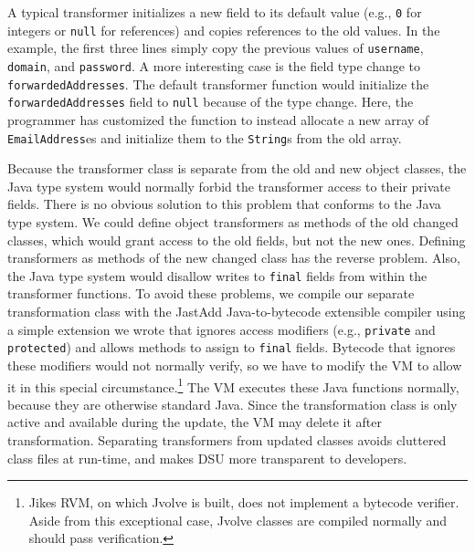\documentclass[9pt]{sigplanconf}
\newcommand{\DSU}{{\sc Jvolve}}
\newcommand{\JikesRVM}{Jikes RVM}
\begin{document}
A typical transformer initializes a new field to its default
value (e.g., {\tt 0} for integers or {\tt null} for references)
and copies references to the old values.  In the example, the first
three lines simply copy the previous values of {\tt username}, {\tt
domain}, and {\tt password}.
A more interesting case is the
field type change to {\tt forwardedAddresses}. %
The default transformer function would %
initialize the {\tt forwardedAddresses} field
to {\tt null} because of the type change.
Here, the programmer has customized the function to instead allocate a new array of {\tt EmailAddress}es
and initialize them to the {\tt String}s from the old array.  

Because the
transformer class is separate from the old and new object classes, the
Java type system would normally forbid the transformer access to their private
fields.  There is no obvious solution to this problem that conforms to
the Java type system. We could define object transformers as
methods of the old changed classes, which would grant access
to the old fields, but not the new ones.  Defining transformers as methods of the
new changed class has the reverse problem. Also, the Java type system
would disallow writes to {\tt final} fields from within the transformer
functions.
To avoid these problems, we
compile our separate transformation class with the JastAdd 
Java-to-bytecode extensible compiler \cite{JastAddJ} using a simple
extension we wrote that ignores access modifiers (e.g., {\tt private} and
{\tt protected}) and
allows methods to assign to {\tt final} fields.  
Bytecode that ignores these modifiers would not normally verify, so we
have to modify the VM to allow it in this special
circumstance.\footnote{\JikesRVM, on which \DSU{} is built, does not
  implement a bytecode verifier.  Aside from this exceptional case,
  \DSU{} classes are compiled normally and should
  pass verification.} The VM executes these 
Java functions normally, because they are otherwise standard Java. 
Since the transformation class is only active and available during the
update, the VM may delete it after transformation.  Separating
transformers from updated classes avoids cluttered class files
at run-time, and makes DSU more transparent to developers.
\end{document}
